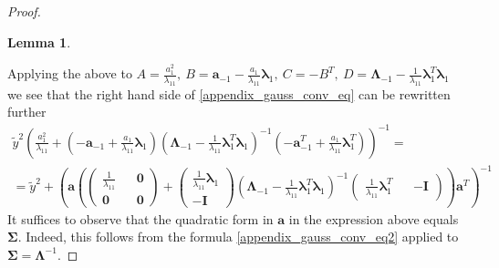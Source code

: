 \documentclass[10pt,fleqn]{amsart}
\newtheorem{lemma}[theorem]{Lemma}
\theoremstyle{definition}
\theoremstyle{remark}
\numberwithin{equation}{section}
\newcommand{\aaa}{\boldsymbol{a}}
\newcommand{\SSigma}{\boldsymbol{\Sigma}}
\newcommand{\llambda}{\boldsymbol{\lambda}}
\newcommand{\LLambda}{\boldsymbol{\Lambda}}
\newcommand{\ytilde}{\widetilde{y}}
\begin{document}
\begin{proof}
\begin{lemma}
\end{lemma}
Applying the above to
$A=\frac{a_1^2}{\lambda_{11}},\ B=\aaa_{-1}-\frac{a_1}{\lambda_{11}}\llambda_1,\ C=-B^T,\ D=\LLambda_{-1}-\frac 1{\lambda_{11}}\llambda_1^T\llambda_1$
we see that the right hand side of \ref{appendix_gauss_conv_eq} can be rewritten further
\begin{equation}\begin{split}
    \ytilde^2\left(
        \frac{a_1^2}{\lambda_{11}}+
        \left(-\aaa_{-1}+\frac{a_1}{\lambda_{11}}\llambda_1\right)
        \left(\LLambda_{-1}-\frac 1{\lambda_{11}}\llambda_1^T\llambda_1\right)^{-1}
        \left(-\aaa_{-1}^T+\frac{a_1}{\lambda_{11}}\llambda_1^T\right)
        \right)^{-1}=\\
        =\ytilde^2+\left(\aaa\left(
            \left(\begin{matrix}\frac 1{\lambda_{11}}&&\boldsymbol{0}\\\boldsymbol{0}&&\boldsymbol{0}\end{matrix}\right)+
            \left(\begin{matrix}\frac 1{\lambda_{11}}\llambda_1\\-\boldsymbol{I}\end{matrix}\right)
            \left(\LLambda_{-1}-\frac 1{\lambda_{11}}\llambda_1^T\llambda_1\right)^{-1}
            \left(\begin{matrix}\frac 1{\lambda_{11}}\llambda_1^T&&-\boldsymbol{I}\end{matrix}\right)
            \right)\aaa^T\right)^{-1}
\end{split}\end{equation}
It suffices to observe that the quadratic form in $\aaa$ in the expression above equals $\SSigma$. Indeed, this follows from
the formula \ref{appendix_gauss_conv_eq2} applied to $\SSigma=\LLambda^{-1}$.
\end{proof}
\end{document}
